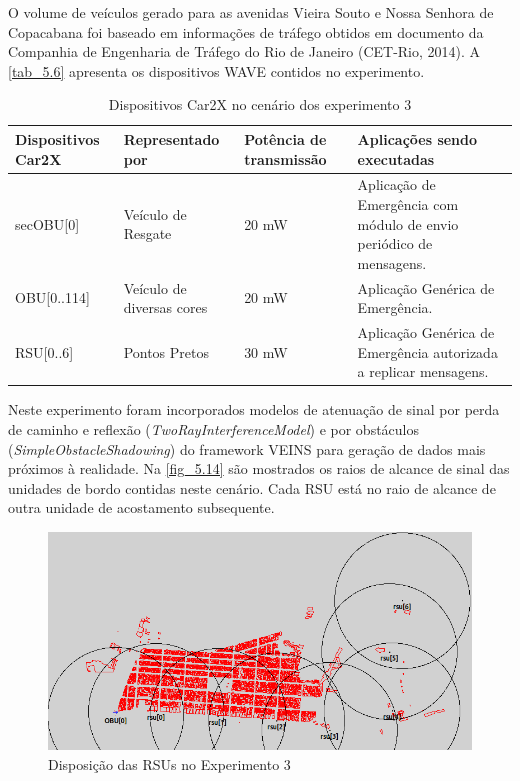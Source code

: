 \documentclass[
12pt,				%
openright,			%
oneside,			%
a4paper,			%
brazil,				%
]{abntex2}
\begin{document}
	\par O volume de veículos gerado para as avenidas Vieira Souto e Nossa Senhora de Copacabana foi baseado em informações de tráfego obtidos em documento da Companhia de Engenharia de Tráfego do Rio de Janeiro (CET-Rio, 2014). A \autoref{tab_5.6} apresenta os dispositivos WAVE contidos no experimento.
	
	\begin{table}[H]
		\centering
		\renewcommand{\arraystretch}{1.5}
		\begin{tabular}{|p{2.4cm}|p{3.65cm}|p{2.5cm}|p{6cm}|}
			\hline
			\textbf{Dispositivos Car2X} & \textbf{Representado por} & \textbf{Potência de transmissão} & \textbf{Aplicações sendo executadas} \\ \hline
			secOBU{[}0{]} & Veículo de Resgate & 20 mW & Aplicação de Emergência com módulo de envio periódico de mensagens. \\ \hline
			OBU{[}0..114{]} & Veículo de diversas cores & 20 mW & Aplicação Genérica de Emergência. \\ \hline
			RSU{[}0..6{]} & Pontos Pretos & 30 mW & Aplicação Genérica de Emergência autorizada a replicar mensagens. \\ \hline
		\end{tabular}
		\caption{Dispositivos Car2X no cenário dos experimento 3}
		\label{tab_5.6}
	\end{table}
	
	\par Neste experimento foram incorporados modelos de atenuação de sinal por perda de caminho e reflexão (\textit{TwoRayInterferenceModel}) e por obstáculos (\textit{SimpleObstacleShadowing}) do framework VEINS para geração de dados mais próximos à realidade. Na \autoref{fig_5.14} são mostrados os raios de alcance de sinal das unidades de bordo contidas neste cenário. Cada RSU está no raio de alcance de outra unidade de acostamento subsequente.
	
	\begin{figure}[H]
		\centering
		\includegraphics[scale=.4]{figuras/cap5/514Cenario3TkEnv}
		\caption{\label{fig_5.14}Disposição das RSUs no Experimento 3}
	\end{figure}	
	
\end{document}
